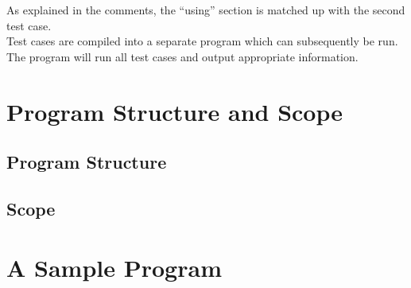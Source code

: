 \documentclass{article}
\begin{document}
As explained in the comments, the ``using'' section is matched up with the second test case.
\\
Test cases are compiled into a separate program which can subsequently be run. The program will run all test cases and output appropriate information. 

\section{Program Structure and Scope}

\subsection{Program Structure}

\subsection{Scope}

\section{A Sample Program}
\end{document}
